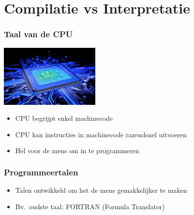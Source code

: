 \section{Compilatie vs Interpretatie}

\frame{\tableofcontents[currentsection]}

\begin{frame}
  \frametitle{Taal van de CPU}
  \begin{center}
    \includegraphics[width=5cm]{cpu.jpg}
  \end{center}
  \begin{itemize}
    \item CPU begrijpt enkel machinecode
    \item CPU kan instructies in machinecode razendsnel uitvoeren
    \item Hel voor de mens om in te programmeren
  \end{itemize}
\end{frame}

\begin{frame}
  \frametitle{Programmeertalen}
  \begin{itemize}
    \item Talen ontwikkeld om het de mens gemakkelijker te maken
    \item Bv.~oudste taal: FORTRAN (Formula Translator)
  \end{itemize}
  \begin{center}
  \end{center}
\end{frame}

